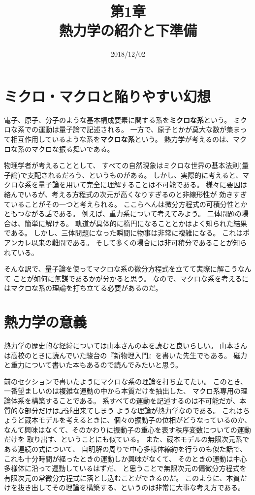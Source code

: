 \documentclass{jsarticle}
\begin{document}
\title{第1章\\熱力学の紹介と下準備}
\date{2018/12/02}
\maketitle
\section{ミクロ・マクロと陥りやすい幻想}
電子、原子、分子のような基本構成要素に関する系を\textbf{ミクロな系}という。
ミクロな系での運動は量子論で記述される。
一方で、原子とかが莫大な数が集まって相互作用しているような系を\textbf{マクロな系}という。
熱力学が考えるのは、マクロな系のマクロな振る舞いである。

物理学者が考えることとして、
すべての自然現象はミクロな世界の基本法則(量子論)で支配されるだろう、というものがある。
しかし、実際的に考えると、マクロな系を量子論を用いて完全に理解することは不可能である。
様々に要因は絡んでいるが、考える方程式の次元が高くなりすぎるのと非線形性が
効きすぎていることがその一つと考えられる。
ここらへんは微分方程式の可積分性とかともつながる話である。
例えば、重力系について考えてみよう。
二体問題の場合は、簡単に解ける。
軌道が具体的に楕円になることとかはよく知られた結果である。
しかし、三体問題になった瞬間に物事は非常に複雑になる。
これはポアンカレ以来の難問である。
そして多くの場合には非可積分であることが知られている。

そんな訳で、量子論を使ってマクロな系の微分方程式を立てて実際に解こうなんて
ことが如何に無謀であるかが分かると思う。
なので、マクロな系を考えるにはマクロな系の理論を打ち立てる必要があるのだ。
\section{熱力学の意義}
熱力学の歴史的な経緯については山本さんの本を読むと良いらしい。
山本さんは高校のときに読んでいた駿台の『新物理入門』を書いた先生でもある。
磁力と重力について書いた本もあるので読んでみたいと思う。

前のセクションで書いたようにマクロな系の理論を打ち立てたい。
このとき、一番望ましいのは複雑な運動の中から本質だけを抽出した、
マクロ系専用の理論体系を構築することである。
系すべての運動を記述するのは不可能だが、本質的な部分だけは記述出来てしまう
ような理論が熱力学なのである。
これはちょうど蔵本モデルを考えるときに、個々の振動子の位相がどうなっているのか、
なんて興味はなくて、そのかわりに振動子の重心を表す秩序変数についての運動だけを
取り出す、ということにも似ている。
また、蔵本モデルの無限次元系である連続の式について、
自明解の周りで中心多様体縮約を行うのも似た話で、
これも十分時間が経ったときの運動しか興味がなくて、
そのときの運動は中心多様体に沿って運動しているはずだ、
と思うことで無限次元の偏微分方程式を有限次元の常微分方程式に落とし込むことができるのだ。
このように、本質だけを抜き出してその理論を構築する、というのは非常に大事な考え方である。
\end{document}
